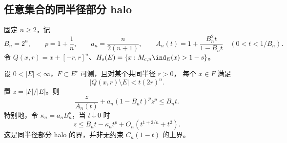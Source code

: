 \subsection{任意集合的同半径部分 halo}
\label{model:partialhalo}
固定 $n\ge2$，记
\[
B_n=2^n,\qquad p=1+\frac1n,\qquad a_n=\frac{n}{2(n+1)},\qquad A_n(t)=1+\frac{B_n^2t}{1-B_n t}\quad(0<t<1/B_n).
\]
令 $Q(x,r)=x+[-r,r]^n$、$H_s(E)=\{x:M_{c,n}\ind_E(x)>1-s\}$。
\begin{proposition}
设 $0<|E|<\infty$，$F\subset E^c$ 可测，且对某个共同半径 $r>0$， 每个 $x\in F$ 满足
\begin{equation}\label{eq:partial-halo-witness}
|Q(x,r)\setminus E|<t(2r)^n.
\end{equation}
置 $z=|F|/|E|$。则
\begin{equation}\label{eq:partial-halo-bound}
\frac{z}{A_n(t)}+a_n(1-B_n t)^p z^p\le B_n t.
\end{equation}
特别地，令 $\kappa_n=a_nB_n^p$，当 $t\downarrow0$ 时
\begin{equation}\label{eq:partial-halo-endpoint}
z\le B_n t-\kappa_nt^p+O_n(t^{1+2/n}+t^2).
\end{equation}
这是同半径部分 halo 的界，并非无约束 $C_n(1-t)$ 的上界。
\end{proposition}
